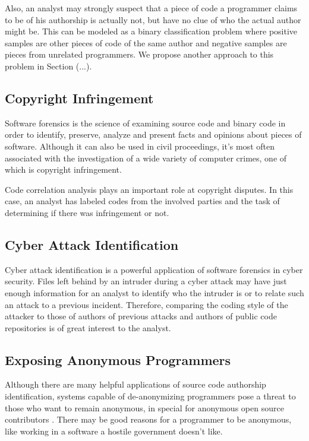 Also, an analyst may strongly suspect that a piece of code a programmer claims to be of his authorship is actually not, but have no clue of who the actual author might be. This can be modeled as a binary classification problem where positive samples are other pieces of code of the same author and negative samples are pieces from unrelated programmers. We propose another approach to this problem in Section (...). %

\subsection{Copyright Infringement}

Software forensics is the science of examining source code and binary code in order to identify, preserve, analyze and present facts and opinions about pieces of software. Although it can also be used in civil proceedings, it's most often associated with the investigation of a wide variety of computer crimes, one of which is copyright infringement.

Code correlation analysis plays an important role at copyright disputes. In this case, an analyst has labeled codes from the involved parties and the task of determining if there was infringement or not.

\subsection{Cyber Attack Identification}

Cyber attack identification is a powerful application of software forensics in cyber security. Files left behind by an intruder during a cyber attack may have just enough information for an analyst to identify who the intruder is or to relate such an attack to a previous incident. Therefore, comparing the coding style of the attacker to those of authors of previous attacks and authors of public code repositories is of great interest to the analyst.


\subsection{Exposing Anonymous Programmers}

Although there are many helpful applications of source code authorship identification, systems capable of de-anonymizing programmers pose a threat to those who want to remain anonymous, in special for anonymous open source contributors \cite{gitblame}. There may be good reasons for a programmer to be anonymous, like working in a software a hostile government doesn't like. 

